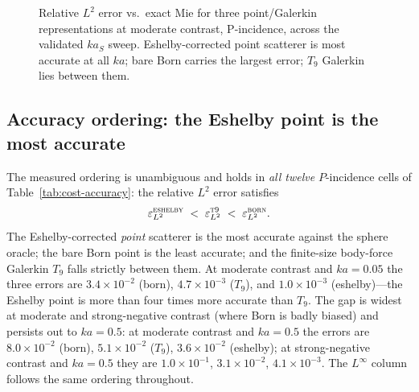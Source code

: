 \documentclass[11pt,a4paper]{article}
\theoremstyle{plain}
\theoremstyle{definition}
\theoremstyle{remark}
\begin{document}
\begin{table}[htbp]
\centering

\caption{Per-channel relative $L^2$ and $L^\infty$ far-field error of each
  single-site representation against the equal-volume elastic Mie sphere,
  $P$-incidence, for three contrasts $\times$ four $ka$ values $\times$ three
  representations.  Background $\alpha = 5000$~m/s, $\beta = 3000$~m/s,
  $\rho_0 = 2500$~kg/m$^3$.  In every $P$ cell the ordering of relative $L^2$
  error is $\textsc{eshelby} < \textsc{t9} < \textsc{born}$: the
  Eshelby-corrected point representation is the most accurate, bare Born the
  least.  Provenance: \texttt{paper/evidence/cost\_accuracy.csv}.}
\label{tab:cost-accuracy}
\end{table}

\begin{figure}[htbp]
\centering

\caption{Relative $L^2$ error vs.\ exact Mie for three point/Galerkin representations
  at moderate contrast, P-incidence, across the validated $ka_S$ sweep.
  Eshelby-corrected point scatterer is most accurate at all $ka$; bare Born
  carries the largest error; $T_9$ Galerkin lies between them.}
\label{fig:error-vs-ka}
\end{figure}

\subsection{Accuracy ordering: the Eshelby point is the most accurate}
\label{sec:evidence-ordering}

The measured ordering is unambiguous and holds in \emph{all twelve}
$P$-incidence cells of Table~\ref{tab:cost-accuracy}: the relative $L^2$
error satisfies
\begin{equation}
  \varepsilon_{L^2}^{\textsc{eshelby}}
  \;<\;
  \varepsilon_{L^2}^{\textsc{t9}}
  \;<\;
  \varepsilon_{L^2}^{\textsc{born}}.
  \label{eq:error-ordering}
\end{equation}
The Eshelby-corrected \emph{point} scatterer is the most accurate against the
sphere oracle; the bare Born point is the least accurate; and the finite-size
body-force Galerkin $T_9$ falls strictly between them.  At moderate contrast
and $ka = 0.05$ the three errors are
$3.4\times10^{-2}$ (born), $4.7\times10^{-3}$ ($T_9$), and
$1.0\times10^{-3}$ (eshelby)---the Eshelby point is more than four times more
accurate than $T_9$.  The gap is widest at moderate and strong-negative contrast
(where Born is badly biased) and persists out to $ka = 0.5$: at moderate
contrast and $ka = 0.5$ the errors are $8.0\times10^{-2}$ (born),
$5.1\times10^{-2}$ ($T_9$), $3.6\times10^{-2}$ (eshelby); at strong-negative
contrast and $ka = 0.5$ they are $1.0\times10^{-1}$, $3.1\times10^{-2}$,
$4.1\times10^{-3}$.  The $L^\infty$ column follows the same ordering throughout.
\end{document}
